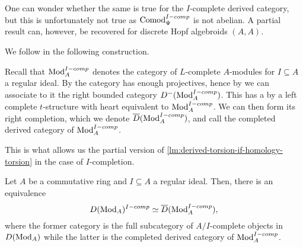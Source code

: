 \begin{remark}
    \label{rm:right-completed-derived-category}
    One can wonder whether the same is true for the $I$-complete derived category, but this is unfortunately not true as $\mathrm{Comod}_\Psi^{I-comp}$ is not abelian. A partial result can, however, be recovered for discrete Hopf algebroids $(A, A)$. 
\end{remark}

We follow \cite{barthel-heard-valenzuela_2020} in the following construction. 

\begin{construction}
    \label{const:completed-derived-category}
    Recall that $\mathrm{Mod}_A^{I-comp}$ denotes the category of $L$-complete $A$-modules for $I\subseteq A$ a regular ideal. By \cite[2.11]{barthel-heard-valenzuela_2020} the category has enough projectives, hence by \cite[1.3.2]{Lurie_HA} we can associate to it the right bounded category $D^-(\mathrm{Mod}_A^{I-comp})$. This has a by \cite[1.3.2.19, 1.3.3.16]{Lurie_HA} a left complete $t$-structure with heart equivalent to $\mathrm{Mod}_A^{I-comp}$. We can then form its right completion, which we denote $\overline{D}(\mathrm{Mod}_A^{I-comp})$, and call the completed derived category of $\mathrm{Mod}_A^{I-comp}$. 
\end{construction}

This is what allows us the partial version of \cref{lm:derived-torsion-if-homology-torsion} in the case of $I$-completion. 

\begin{proposition}
    \label{prop:pulling-out-completion}
    Let $A$ be a commutative ring and $I\subseteq A$ a regular ideal. Then, there is an equivalence 
    $$D(\mathrm{Mod}_A)^{I-comp}\simeq \overline{D}(\mathrm{Mod}_A^{I-comp}),$$
    where the former category is the full subcategory of $A/I$-complete objects in $D(\mathrm{Mod}_A)$ while the latter is the completed derived category of $\mathrm{Mod}_A^{I-comp}$. 
\end{proposition}






































